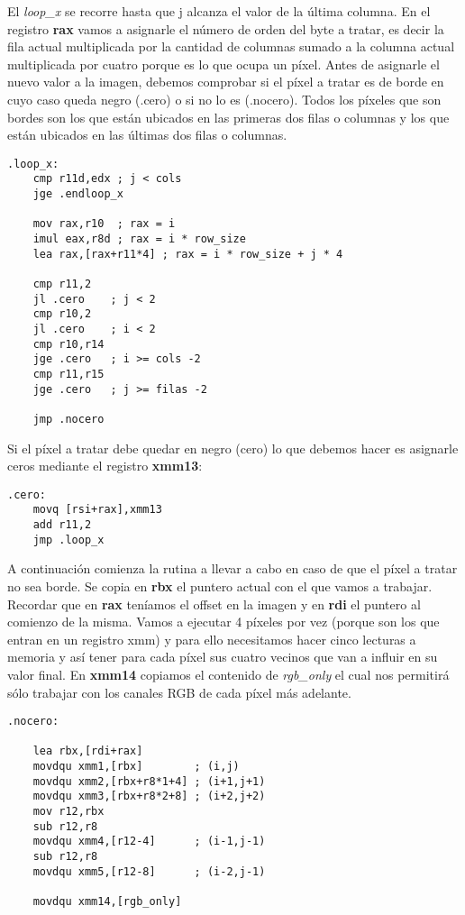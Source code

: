 \documentclass[a4paper]{article}
\begin{document}
\indent El \textit{loop_x} se recorre hasta que j alcanza el valor de la \'ultima columna. En el registro \textbf{rax} vamos a asignarle el n\'umero de orden del byte a tratar, es decir la fila actual multiplicada por la cantidad de columnas sumado a la columna actual multiplicada por cuatro porque es lo que ocupa un p\'ixel. 
Antes de asignarle el nuevo valor a la imagen, debemos comprobar si el p\'ixel a tratar es de borde en cuyo caso queda negro (.cero) o si no lo es (.nocero). Todos los p\'ixeles que son bordes son los que est\'an ubicados en las primeras dos filas o columnas y los que est\'an ubicados en las \'ultimas dos filas o columnas.
 \begin{codesnippet}
\begin{verbatim}
.loop_x:
    cmp r11d,edx ; j < cols 
    jge .endloop_x

    mov rax,r10  ; rax = i
    imul eax,r8d ; rax = i * row_size 
    lea rax,[rax+r11*4] ; rax = i * row_size + j * 4

    cmp r11,2   
    jl .cero    ; j < 2
    cmp r10,2 
    jl .cero    ; i < 2
    cmp r10,r14
    jge .cero   ; i >= cols -2
    cmp r11,r15
    jge .cero   ; j >= filas -2

    jmp .nocero
\end{verbatim}
\end{codesnippet}

\newpage
\indent Si el p\'ixel a tratar debe quedar en negro (cero) lo que debemos hacer es asignarle ceros mediante el registro \textbf{xmm13}:
 \begin{codesnippet}
\begin{verbatim}
.cero:
    movq [rsi+rax],xmm13        
    add r11,2
    jmp .loop_x
\end{verbatim}
\end{codesnippet}

A continuaci\'on comienza la rutina a llevar a cabo en caso de que el p\'ixel a tratar no sea borde. Se copia en \textbf{rbx} el puntero actual con el que vamos a trabajar. Recordar que en \textbf{rax} ten\'iamos el offset en la imagen y en \textbf{rdi} el puntero al comienzo de la misma. Vamos a ejecutar 4 p\'ixeles por vez (porque son los que entran en un registro xmm) y para ello necesitamos hacer cinco lecturas a memoria y as\'i tener para cada p\'ixel sus cuatro vecinos que van a influir en su valor final. En \textbf{xmm14} copiamos el contenido de \textit{rgb_only} el cual nos permitir\'a s\'olo trabajar con los canales RGB de cada p\'ixel m\'as adelante.
 \begin{codesnippet}
\begin{verbatim}
.nocero:
    
    lea rbx,[rdi+rax]
    movdqu xmm1,[rbx]        ; (i,j)
    movdqu xmm2,[rbx+r8*1+4] ; (i+1,j+1)
    movdqu xmm3,[rbx+r8*2+8] ; (i+2,j+2)
    mov r12,rbx
    sub r12,r8
    movdqu xmm4,[r12-4]      ; (i-1,j-1)
    sub r12,r8
    movdqu xmm5,[r12-8]      ; (i-2,j-1)

    movdqu xmm14,[rgb_only]
\end{verbatim}
\end{codesnippet}
\end{document}
